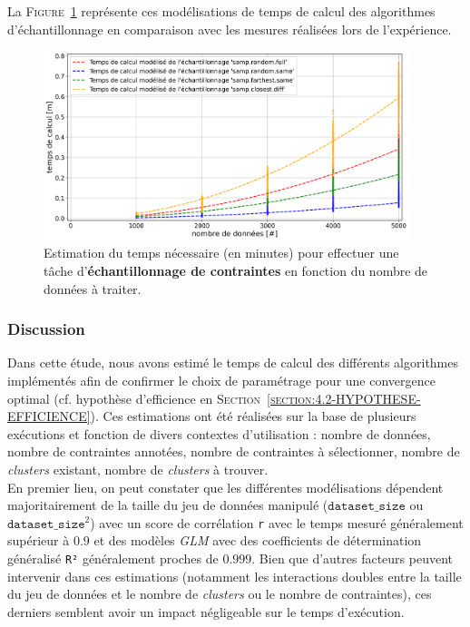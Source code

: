 			La \textsc{Figure~\ref{figure:4.3.2-ETUDE-COUTS-TEMPS-CALCUL-MODELISATION-SAMPLING}} représente ces modélisations de temps de calcul des algorithmes d'échantillonnage en comparaison avec les mesures réalisées lors de l'expérience.
			\newline
			\begin{figure}[!htb]
				\centering
				\includegraphics[width=0.95\textwidth]{figures/etude-temps-calcul-modelisation-4samp}
				\caption{
					Estimation du temps nécessaire (en minutes) pour effectuer une tâche d'\textbf{échantillonnage de contraintes} en fonction du nombre de données à traiter.
				}
				\label{figure:4.3.2-ETUDE-COUTS-TEMPS-CALCUL-MODELISATION-SAMPLING}
			\end{figure}

		\subsubsection{Discussion}
		
			Dans cette étude, nous avons estimé le temps de calcul des différents algorithmes implémentés afin de confirmer le choix de paramétrage pour une convergence optimal (cf. hypothèse d'efficience en \textsc{Section~\ref{section:4.2-HYPOTHESE-EFFICIENCE}}).
			Ces estimations ont été réalisées sur la base de plusieurs exécutions et fonction de divers contextes d'utilisation : nombre de données, nombre de contraintes annotées, nombre de contraintes à sélectionner, nombre de \textit{clusters} existant, nombre de \textit{clusters} à trouver.
			\\
			
			En premier lieu, on peut constater que les différentes modélisations dépendent majoritairement de la taille du jeu de données manipulé ($\texttt{dataset\_size}$ ou $\texttt{dataset\_size}^{2}$) avec un score de corrélation \texttt{r} avec le temps mesuré généralement supérieur à $0.9$ et des modèles \textit{GLM} avec des coefficients de détermination généralisé \texttt{R²} généralement proches de $0.999$.
			Bien que d'autres facteurs peuvent intervenir dans ces estimations (notamment les interactions doubles entre la taille du jeu de données et le nombre de \textit{clusters} ou le nombre de contraintes), ces derniers semblent avoir un impact négligeable sur le temps d'exécution.
			
